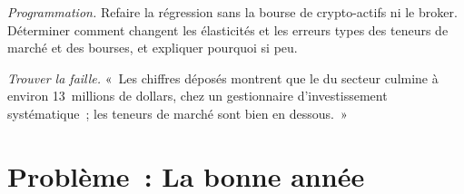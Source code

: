 \begin{exercise}[$\star\star\star$]\label{exo:in:revenue-and-profit-across-the-industry:7}
\emph{Programmation.} Refaire la régression sans la bourse de crypto-actifs ni le broker. Déterminer comment changent les élasticités et les erreurs types des teneurs de marché et des
bourses, et expliquer pourquoi si peu.
\end{exercise}

\begin{exercise}[$\star\star\star$]\label{exo:in:revenue-and-profit-across-the-industry:8}
\emph{Trouver la faille.} «~Les chiffres déposés montrent que le  du secteur culmine à environ 13~millions de dollars, chez un
gestionnaire d'investissement systématique~; les teneurs de marché sont bien en dessous.~»
\end{exercise}

\section{Problème~: La bonne année}

